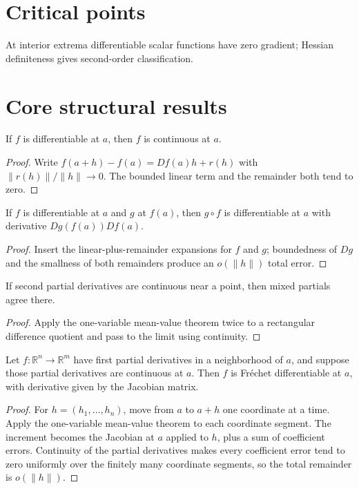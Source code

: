 \section{Critical points}
At interior extrema differentiable scalar functions have zero gradient; Hessian definiteness gives second-order classification.

\section{Core structural results}

\begin{theorem}\label{thm:ii08-01}
If $f$ is differentiable at $a$, then $f$ is continuous at $a$.
\begin{proof}
Write $f(a+h)-f(a)=Df(a)h+r(h)$ with $\|r(h)\|/\|h\|\to0$. The bounded linear term and the remainder both tend to zero.
\end{proof}
\end{theorem}

\begin{theorem}\label{thm:ii08-02}
If $f$ is differentiable at $a$ and $g$ at $f(a)$, then $g\circ f$ is differentiable at $a$ with derivative $Dg(f(a))Df(a)$.
\begin{proof}
Insert the linear-plus-remainder expansions for $f$ and $g$; boundedness of $Dg$ and the smallness of both remainders produce an $o(\|h\|)$ total error.
\end{proof}
\end{theorem}

\begin{theorem}\label{thm:ii08-03}
If second partial derivatives are continuous near a point, then mixed partials agree there.
\begin{proof}
Apply the one-variable mean-value theorem twice to a rectangular difference quotient and pass to the limit using continuity.
\end{proof}
\end{theorem}

\begin{theorem}\label{thm:ii08-04}
Let $f:\mathbb R^n\to\mathbb R^m$ have first partial derivatives in a neighborhood of $a$, and suppose those partial derivatives are continuous at $a$. Then $f$ is Fr\'echet differentiable at $a$, with derivative given by the Jacobian matrix.
\begin{proof}
For $h=(h_1,\ldots,h_n)$, move from $a$ to $a+h$ one coordinate at a time. Apply the one-variable mean-value theorem to each coordinate segment. The increment becomes the Jacobian at $a$ applied to $h$, plus a sum of coefficient errors. Continuity of the partial derivatives makes every coefficient error tend to zero uniformly over the finitely many coordinate segments, so the total remainder is $o(\|h\|)$.
\end{proof}
\end{theorem}

